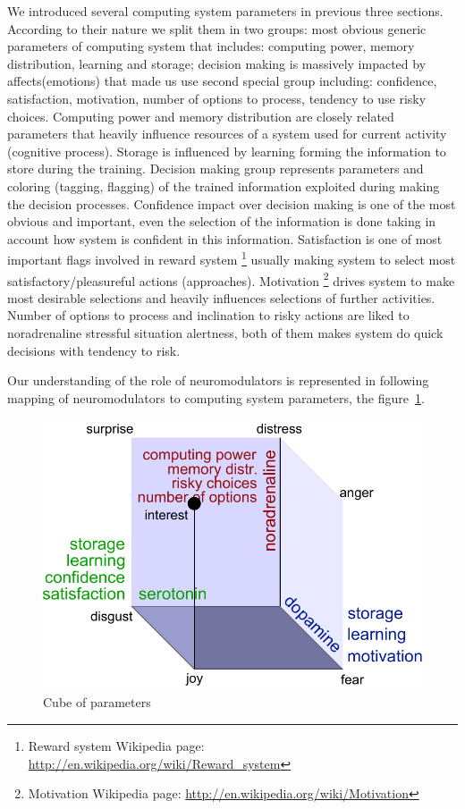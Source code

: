 We introduced several computing system parameters in previous three sections. According to their nature we split them in two groups: most obvious generic parameters of computing system that includes: computing power, memory distribution, learning and storage; decision making is massively impacted by affects(emotions) that made us use second special group including: confidence, satisfaction, motivation, number of options to process, tendency to use risky choices. Computing power and memory distribution are closely related parameters that heavily influence resources of a system used for current activity (cognitive process). Storage is influenced by learning forming the information to store during the training. Decision making group represents parameters and coloring (tagging, flagging) of the trained information exploited during making the decision processes. Confidence impact over decision making is one of the most obvious and important, even the selection of the information is done taking in account how system is confident in this information. Satisfaction is one of most important flags involved in reward system \footnote{Reward system Wikipedia page: \url{http://en.wikipedia.org/wiki/Reward_system}} usually making system to select most satisfactory/pleasureful actions (approaches). Motivation \footnote{Motivation Wikipedia page: \url{http://en.wikipedia.org/wiki/Motivation}} drives system to make most desirable selections and heavily influences selections of further activities. Number of options to process and inclination to risky actions are liked to noradrenaline stressful situation alertness, both of them makes system do quick decisions with tendency to risk.

Our understanding of the role of neuromodulators  is represented in following mapping of neuromodulators to computing system parameters, the figure~\ref{cube_of_parameters}.

\begin{figure}
\begin{center}
 \includegraphics[height=8cm]{figure3_cube_of_parameters}
\end{center}
\caption{Cube of parameters}
\label{cube_of_parameters}
\end{figure}

